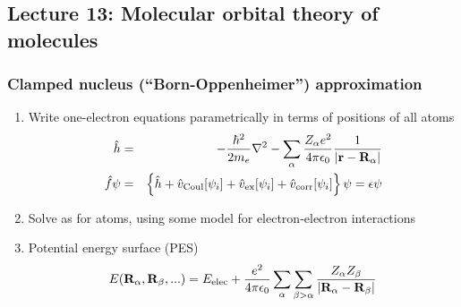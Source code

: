 \documentclass[11pt]{article}
\begin{document}
\subsection{Lecture 13: Molecular orbital theory of molecules}
\label{sec:org7ecc7ce}
\subsubsection{Clamped nucleus (``Born-Oppenheimer'') approximation}
\label{sec:org71c07af}
\begin{enumerate}
\item Write one-electron equations parametrically in terms of positions of  all atoms
\begin{eqnarray}
\hat h & = & -\frac{\hbar^2}{2m_e}\nabla^2-\sum_\alpha \frac{Z_\alpha
    e^2}{4\pi\epsilon_0}\frac{1}{|{\bf r}-{\bf R}_\alpha|} \\
\hat f\psi & = & \left\{\hat h + \hat v_\mathrm{Coul}[\psi_i] + \hat
      v_\mathrm{ex}[\psi_i]+\hat v_\mathrm{corr}[\psi_i] \right\}\psi=\epsilon\psi
\end{eqnarray}
\item Solve as for atoms, using some model for electron-electron interactions
\item Potential energy surface (PES)
\[ E({\bf R}_\alpha, {\bf
            R}_\beta,...)=E_\mathrm{elec}+\frac{e^2}{4\pi\epsilon_0}\sum_\alpha\sum_{\beta>\alpha}\frac{Z_\alpha
            Z_\beta}{|{\bf R}_\alpha-{\bf R}_\beta|} \]
\end{enumerate}
\end{document}
